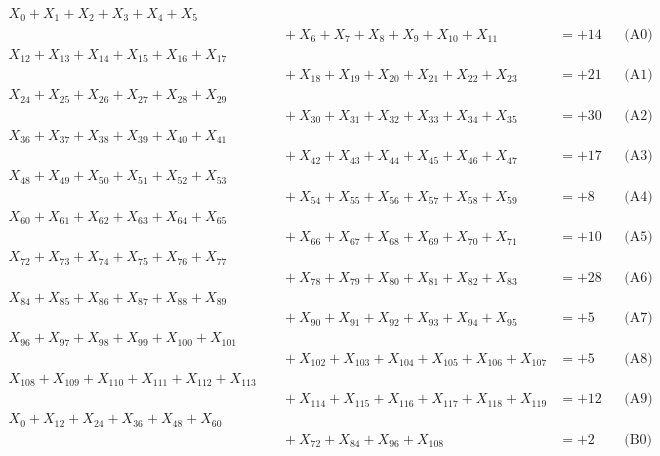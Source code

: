 \documentclass[a4paper,10pt]{article}
\begin{document}
\allowdisplaybreaks
{\small
\begin{align}
X_{0} + X_{1} + X_{2} + X_{3} + X_{4} + X_{5} \\[0.1ex]
&\quad  + X_{6} + X_{7} + X_{8} + X_{9} + X_{10} + X_{11} &= +14 && \text{(A0)} \\
X_{12} + X_{13} + X_{14} + X_{15} + X_{16} + X_{17} \\[0.1ex]
&\quad  + X_{18} + X_{19} + X_{20} + X_{21} + X_{22} + X_{23} &= +21 && \text{(A1)} \\
X_{24} + X_{25} + X_{26} + X_{27} + X_{28} + X_{29} \\[0.1ex]
&\quad  + X_{30} + X_{31} + X_{32} + X_{33} + X_{34} + X_{35} &= +30 && \text{(A2)} \\
X_{36} + X_{37} + X_{38} + X_{39} + X_{40} + X_{41} \\[0.1ex]
&\quad  + X_{42} + X_{43} + X_{44} + X_{45} + X_{46} + X_{47} &= +17 && \text{(A3)} \\
X_{48} + X_{49} + X_{50} + X_{51} + X_{52} + X_{53} \\[0.1ex]
&\quad  + X_{54} + X_{55} + X_{56} + X_{57} + X_{58} + X_{59} &= +8 && \text{(A4)} \\
\allowbreak
X_{60} + X_{61} + X_{62} + X_{63} + X_{64} + X_{65} \\[0.1ex]
&\quad  + X_{66} + X_{67} + X_{68} + X_{69} + X_{70} + X_{71} &= +10 && \text{(A5)} \\
X_{72} + X_{73} + X_{74} + X_{75} + X_{76} + X_{77} \\[0.1ex]
&\quad  + X_{78} + X_{79} + X_{80} + X_{81} + X_{82} + X_{83} &= +28 && \text{(A6)} \\
X_{84} + X_{85} + X_{86} + X_{87} + X_{88} + X_{89} \\[0.1ex]
&\quad  + X_{90} + X_{91} + X_{92} + X_{93} + X_{94} + X_{95} &= +5 && \text{(A7)} \\
X_{96} + X_{97} + X_{98} + X_{99} + X_{100} + X_{101} \\[0.1ex]
&\quad  + X_{102} + X_{103} + X_{104} + X_{105} + X_{106} + X_{107} &= +5 && \text{(A8)} \\
X_{108} + X_{109} + X_{110} + X_{111} + X_{112} + X_{113} \\[0.1ex]
&\quad  + X_{114} + X_{115} + X_{116} + X_{117} + X_{118} + X_{119} &= +12 && \text{(A9)} \\
\allowbreak
X_{0} + X_{12} + X_{24} + X_{36} + X_{48} + X_{60} \\[0.1ex]
&\quad  + X_{72} + X_{84} + X_{96} + X_{108} &= +2 && \text{(B0)} \\

\end{align}}
\end{document}
